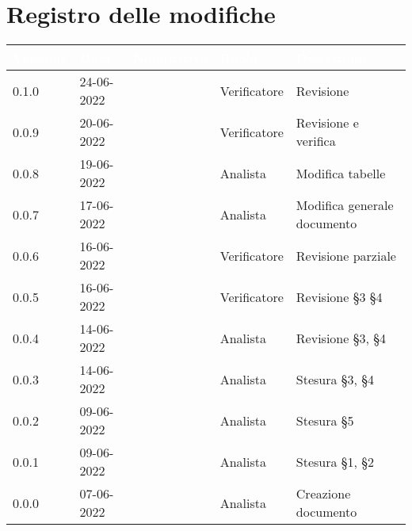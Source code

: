 \section*{Registro delle modifiche}
{

\newlength{\freewidth}
\setlength{\freewidth}{\dimexpr\textwidth-10\tabcolsep}
\renewcommand{\arraystretch}{1.5}
\centering
\setlength{\aboverulesep}{0pt}
\setlength{\belowrulesep}{0pt}
\begin{longtable}{C{.13\freewidth} C{.15\freewidth} C{.26\freewidth} C{.18\freewidth} C{.282379\freewidth}}
	\toprule
{}
\textcolor{white}{\textbf{Versione}}&
\textcolor{white}{\textbf{Data}}&
\textcolor{white}{\textbf{Nominativo}}&
\textcolor{white}{\textbf{Ruolo}}&
\textcolor{white}{\textbf{Descrizione}}\\	
\toprule
\endhead


0.1.0 & 24-06-2022 & \giulio{} & Verificatore & Revisione \\
0.0.9 & 20-06-2022 & \angela{} & Verificatore & Revisione e verifica \\
0.0.8 & 19-06-2022 & \matteo{} & Analista & Modifica tabelle \\
0.0.7 & 17-06-2022 & \matteo{} & Analista & Modifica generale documento \\
0.0.6 & 16-06-2022 & \angela{} & Verificatore & Revisione parziale \\
0.0.5 & 16-06-2022 & \marcob{} & Verificatore & Revisione \S 3 \S 4 \\
0.0.4 & 14-06-2022 & \matteo{} & Analista & Revisione \S 3, \S 4\\
0.0.3 & 14-06-2022 & \ruth{} & Analista & Stesura \S 3, \S 4\\
0.0.2 & 09-06-2022 & \matteo{} & Analista & Stesura \S 5\\
0.0.1 & 09-06-2022 & \marcob{} & Analista & Stesura \S 1, \S 2\\
0.0.0 & 07-06-2022 & \matteo{} & Analista & Creazione documento\\	
\bottomrule
\end{longtable}
}
